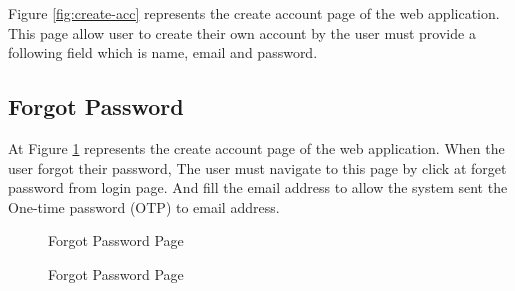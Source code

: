 \documentclass[12pt,oneside,openright,a4paper]{cpe-english-project}
\begin{document}
Figure \ref{fig:create-acc} represents the create account page of the web application. This page allow user to create their own account by the user must provide a following field which is name, email and password.

\subsection{Forgot Password}

At Figure \ref{fig:Forgot-Password} represents the create account page of the web application. When the user forgot their password, The user must navigate to this page by click at forget password from login page. And fill the email address to allow the system sent the One-time password (OTP) to email address. 


\begin{figure}[!h]
\centering
{}
\caption{Forgot Password Page}\label{fig:Forgot-Password}
\end{figure}



\begin{figure}[!h]
\centering
{}
\caption{Forgot Password Page}\label{fig:Forgot-Password-code}
\end{figure}
\end{document}
